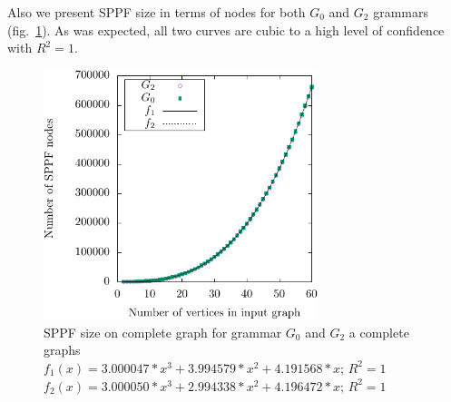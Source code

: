 Also we present SPPF size in terms of nodes for both $G_0$ and $G_2$ grammars (fig.~\ref{pic:SPPFSize}).
As was expected, all two curves are cubic to a high level of confidence with $R^2 = 1$. 

\begin{figure}[ht]
\centering




 \includegraphics[width=8cm]{dot/grph2.pdf}
\caption{SPPF size on complete graph for grammar $G_0$ and $G_2$ a complete graphs \\
$f_1(x) = 3.000047*x^3 + 3.994579*x^2 + 4.191568*x$; $R^2 = 1$\\
$f_2(x) = 3.000050*x^3 + 2.994338*x^2 + 4.196472*x$; $R^2 = 1$}
\label{pic:SPPFSize}
\end{figure}


%




